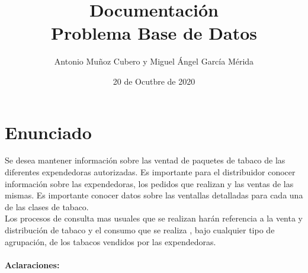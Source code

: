 \documentclass{article}
\title{Documentación \\\large \textbf{Problema Base de Datos}}
\author{Antonio Muñoz Cubero y Miguel Ángel García Mérida}
\date{20 de Ocutbre de 2020}
\begin{document}
\maketitle
{}

\newpage
\section{Enunciado}
Se desea mantener información sobre las ventad de paquetes de tabaco de las diferentes expendedoras autorizadas. Es importante para el distribuidor conocer información
sobre las expendedoras, los pedidos que realizan y las ventas de las mismas. Es importante conocer datos sobre las ventallas detalladas para cada una de las clases de 
tabaco.
\\
Los procesos de consulta mas usuales que se realizan harán referencia a la venta y distribución de tabaco y el consumo que se realiza , bajo cualquier tipo de agrupación,
de los tabacos vendidos por las expendedoras.
\\
\\
\textbf{Aclaraciones:}
\\
\end{document}
